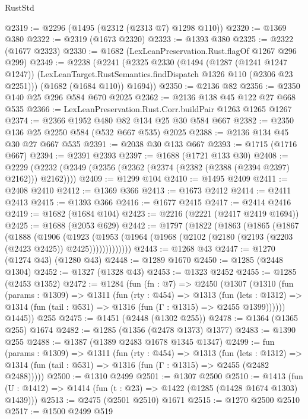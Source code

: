 \begin{lexlean}{RustStd}
\begin{coremodule}
@2319 := @2296 (@1495 (@2312 (@2313 @7) @1298 @110))
@2320 := @1369 @380
@2322 := @2319 (@1673 @2320)
@2323 := @1393 @380
@2325 := @2322 (@1677 @2323)
@2330 := @1682 (LexLeanPreservation.Rust.flagOf @1267 @296 @299)
@2349 := @2238
    (@2241
      (@2325
        @2330
        (@1494
          (@1287 (@1241 @1247 @1247))
          (LexLeanTarget.RustSemantics.findDispatch @1326 @110 (@2306 @23 @2251)))
        (@1682 (@1684 @110))
        @1694))
@2350 := @2136 @82
@2356 := @2350 @140 @25 @296 @584 @670 @2025
@2362 := @2136 @138 @45 @122 @27 @668 @535
@2366 := LexLeanPreservation.Rust.Corr.buildPair @1263 @1265 @1267
@2374 := @2366 @1952 @480 @82 @134 @25 @30 @584 @667
@2382 := @2350 @136 @25 @2250 @584 (@532 @667 @535) @2025
@2388 := @2136 @134 @45 @30 @27 @667 @535
@2391 := @2038 @30 @133 @667
@2393 := @1715 (@1716 @667)
@2394 := @2391 @2393
@2397 := @1688 (@1721 @133 @30)
@2408 := @2229 (@2232 (@2349 (@2356 (@2362 (@2374 (@2382 (@2388 (@2394 @2397) @2162))) @2162))))
@2409 := @1299 @104
@2410 := @1495 @2409
@2411 := @2408 @2410
@2412 := @1369 @366
@2413 := @1673 @2412
@2414 := @2411 @2413
@2415 := @1393 @366
@2416 := @1677 @2415
@2417 := @2414 @2416
@2419 := @1682 (@1684 @104)
@2423 := @2216 (@2221 (@2417 @2419 @1694))
@2425 := @1688 (@2053 @629)
@2442 := @1797
    (@1822
      (@1863
        (@1865
          (@1867
            (@1888
              (@1906
                (@1923
                  (@1953 (@1964 (@1968 (@2102 (@2180 (@2193 (@2203 (@2423 @2425)) @2425)))))))))))))
@2443 := @1268 @43
@2447 := @1270 (@1274 @43) (@1280 @43)
@2448 := @1289 @1670
@2450 := @1285 (@2448 @1304)
@2452 := @1327 (@1328 @43)
@2453 := @1323 @2452
@2455 := @1285 (@2453 @1352)
@2472 := @1284
    (fun (fn : @7) =>
    @2450
      (@1307
        (@1310
          (fun (params : @1309) =>
          @1311
            (fun (rty : @454) =>
            @1313
              (fun (lets : @1312) =>
              @1314 (fun (tail : @531) => @1316 (fun (Γ : @1315) => @2455 @1399))))))
        @1445))
    @255
@2475 := @1451 (@2448 (@1302 @255))
@2478 := @1364 (@1365 @255) @1674
@2482 := @1285 (@1356 (@2478 @1373) @1377)
@2483 := @1390 @255
@2488 := @1387 (@1389 @2483 @1678 @1345 @1347)
@2499 := fun (params : @1309) =>
  @1311
    (fun (rty : @454) =>
    @1313
      (fun (lets : @1312) =>
      @1314 (fun (tail : @531) => @1316 (fun (Γ : @1315) => @2455 (@2482 @2488)))))
@2500 := @1310 @2499
@2501 := @1307 @2500
@2510 := @1413 (fun (U : @1412) => @1414 (fun (t : @23) => @1422 (@1285 (@1428 @1674 @1303) @1439)))
@2513 := @2475 (@2501 @2510) @1671
@2515 := @1270 @2500 @2510
@2517 := @1500 @2499 @519

\end{coremodule}
\end{lexlean}
